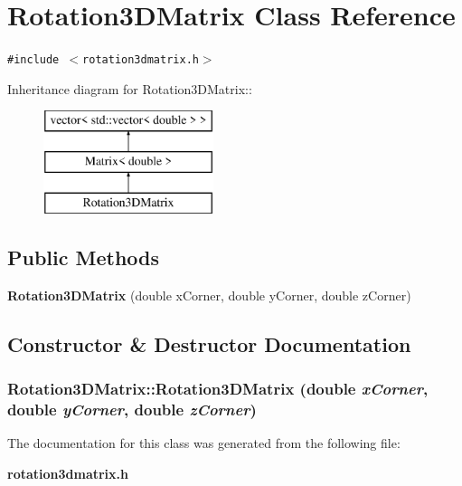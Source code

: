 \section{Rotation3DMatrix Class Reference}
\label{classRotation3DMatrix}
{\tt \#include $<$rotation3dmatrix.h$>$}

Inheritance diagram for Rotation3DMatrix::\begin{figure}[H]
\begin{center}
\leavevmode
\includegraphics[height=3cm]{classRotation3DMatrix}
\end{center}
\end{figure}
\subsection*{Public Methods}
\begin{CompactItemize}
\item 
{\bf Rotation3DMatrix} (double x\-Corner, double y\-Corner, double z\-Corner)
\end{CompactItemize}


\subsection{Constructor \& Destructor Documentation}
\subsubsection{\setlength{\rightskip}{0pt plus 5cm}Rotation3DMatrix::Rotation3DMatrix (double {\em x\-Corner}, double {\em y\-Corner}, double {\em z\-Corner})\hspace{0.3cm}{\tt  [inline]}}\label{classRotation3DMatrix_a0}




The documentation for this class was generated from the following file:\begin{CompactItemize}
\item 
{\bf rotation3dmatrix.h}\end{CompactItemize}
